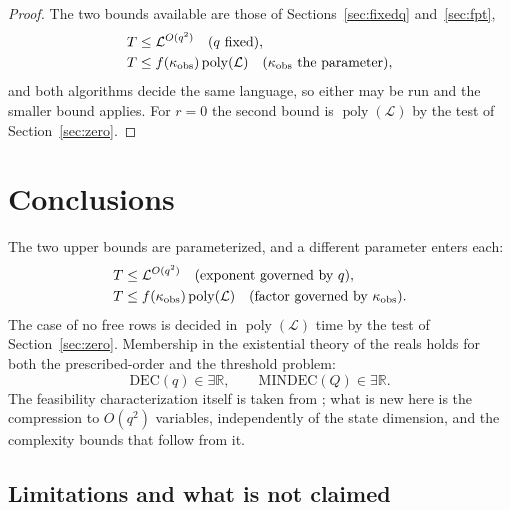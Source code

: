 \begin{proof}
The two bounds available are those of Sections~\ref{sec:fixedq} and~\ref{sec:fpt},
\begin{equation*}
\begin{aligned}
T&\le\mathcal L^{O(q^2)}\quad(q\ \text{fixed}),\\
T&\le f(\kappa_{\rm obs})\operatorname{poly}(\mathcal L)\quad(\kappa_{\rm obs}\ \text{the parameter}),
\end{aligned}
\end{equation*}
and both algorithms decide the same language, so either may be run and the smaller bound applies. For $r=0$ the second bound is $\operatorname{poly}(\mathcal L)$ by the test of Section~\ref{sec:zero}.
\end{proof}


\section{Conclusions}\label{sec:conclusions}

The two upper bounds are parameterized, and a different parameter enters each:
\begin{equation*}
\begin{aligned}
T&\le\mathcal L^{O(q^2)}\quad\text{(exponent governed by }q\text{)},\\
T&\le f(\kappa_{\rm obs})\operatorname{poly}(\mathcal L)\quad\text{(factor governed by }\kappa_{\rm obs}\text{)} .
\end{aligned}
\end{equation*}
The case of no free rows is decided in $\operatorname{poly}(\mathcal L)$ time by the test of Section~\ref{sec:zero}. Membership in the existential theory of the reals holds for both the prescribed-order and the threshold problem:
\begin{equation*}
\mathrm{DEC}(q)\in\exists\mathbb R,\qquad \mathrm{MINDEC}(Q)\in\exists\mathbb R .
\end{equation*}
The feasibility characterization itself is taken from \cite{fer10,dar25,fer26a,fer26b}; what is new here is the compression to $O(q^2)$ variables, independently of the state dimension, and the complexity bounds that follow from it.

\subsection{Limitations and what is not claimed}\label{sec:limits}

